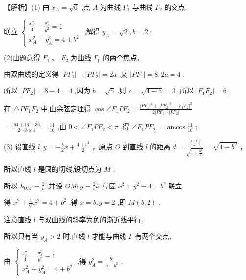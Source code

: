 \documentclass[10pt]{article}
\begin{document}
【解析】(1) 由 \({x}_{A} = \sqrt{6}\) ,点 \(A\) 为曲线 \({\Gamma }_{1}\) 与曲线 \({\Gamma }_{2}\) 的交点,

联立 \(\left\{  \begin{array}{l} \frac{{x}_{A}^{2}}{4} - \frac{{y}_{A}^{2}}{{b}^{2}} = 1 \\  {x}_{A}^{2} + {y}_{A}^{2} = 4 + {b}^{2} \end{array}\right.\) ,解得 \({y}_{A} = \sqrt{2},b = 2\) ;

(2)由题意得 \({F}_{1}\text{ 、 }{F}_{2}\) 为曲线 \({\Gamma }_{1}\) 的两个焦点，

由双曲线的定义得 \(\left| {P{F}_{1}}\right|  - \left| {P{F}_{2}}\right|  = {2a}\) ,又 \(\left| {P{F}_{1}}\right|  = 8,{2a} = 4\) ,

所以 \(\left| {P{F}_{2}}\right|  = 8 - 4 = 4\) ,因为 \(b = \sqrt{5}\) ,则 \(c = \sqrt{4 + 5} = 3\) ,所以 \(\left| {{F}_{1}{F}_{2}}\right|  = 6\) ,

在 \(\bigtriangleup P{F}_{1}{F}_{2}\) 中,由余弦定理得 \(\cos \angle {F}_{1}P{F}_{2} = \frac{{\left| P{F}_{1}\right| }^{2} + {\left| P{F}_{2}\right| }^{2} - {\left| {F}_{1}{F}_{2}\right| }^{2}}{2\left| {P{F}_{1}}\right|  \cdot  \left| {P{F}_{2}}\right| }\)

\(= \frac{{64} + {16} - {36}}{2 \times  8 \times  4} = \frac{11}{16}\) ,由 \(0 < \angle {F}_{1}P{F}_{2} < \pi\) ,得 \(\angle {F}_{1}P{F}_{2} = \arccos \frac{11}{16}\) ;

(3) 设直线 \(l : y =  - \frac{b}{2}x + \frac{4 + {b}^{2}}{2}\) ，原点 \(O\) 到直线 \(l\) 的距离 \(d = \frac{\left| \frac{4 + {b}^{2}}{2}\right| }{\sqrt{1 + \frac{{b}^{2}}{4}}} = \sqrt{4 + {b}^{2}}\) ，

所以直线 \(l\) 是圆的切线,设切点为 \(M\) ,

所以 \({k}_{OM} = \frac{2}{b}\) ,并设 \({OM} : y = \frac{2}{b}x\) 与圆 \({x}^{2} + {y}^{2} = 4 + {b}^{2}\) 联立,

得 \({x}^{2} + \frac{4}{{b}^{2}}{x}^{2} = 4 + {b}^{2}\) ,得 \(x = b,y = 2\) ,即 \(M\left( {b,2}\right)\) ,

注意直线 \(l\) 与双曲线的斜率为负的渐近线平行,

所以只有当 \({y}_{A} > 2\) 时,直线 \(l\) 才能与曲线 \(\Gamma\) 有两个交点,

由 \(\left\{  \begin{array}{l} \frac{{x}_{A}^{2}}{4} - \frac{{y}_{A}^{2}}{{b}^{2}} = 1 \\  {x}_{A}^{2} + {y}_{A}^{2} = 4 + {b}^{2} \end{array}\right.\) ,得 \({y}_{A}^{2} = \frac{{b}^{4}}{a + {b}^{2}}\) ,
\end{document}
